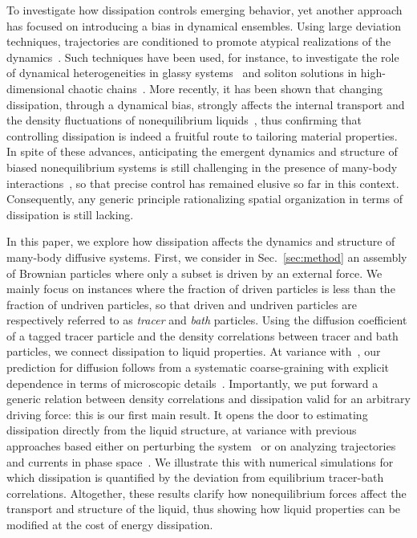 \documentclass[superscriptaddress, twocolumn, prx, longbibliography, nofootinbib]{revtex4-1}
\begin{document}
To investigate how dissipation controls emerging behavior, yet another approach {has focused on} introducing a bias in dynamical ensembles. Using large deviation techniques, trajectories are conditioned to promote atypical realizations of the dynamics~\cite{Touchette2009, Jack2010}. {Such techniques have been used}, for instance, to investigate the role of dynamical heterogeneities in glassy systems~\cite{garrahan2007, Hedges2009, Pitard2011, Speck2012, Bodineau2012a, Limmer2014, Nemoto2017} and soliton solutions in high-dimensional chaotic chains~\cite{tailleur2007probing, laffargue2013}. More recently, it has been shown that changing dissipation, through a dynamical bias, strongly affects the internal transport and the density fluctuations of nonequilibrium liquids~\cite{Cagnetta2017, Nemoto2019}, thus confirming that controlling dissipation is indeed a fruitful route to tailoring material properties. {In spite of these advances}, anticipating the emergent dynamics and structure of biased nonequilibrium systems is still challenging in the presence of many-body interactions~\cite{Chetrite2013, Jack2010}, so that precise control has remained elusive so far in this context. {Consequently}, any generic principle rationalizing spatial organization in terms of dissipation is still lacking.


In this paper, we explore how dissipation affects the dynamics and structure of many-body diffusive systems. First, we consider in Sec.~\ref{sec:method} an assembly of Brownian particles where only a subset is driven by an external force. We mainly focus on instances where the fraction of driven particles is less than the fraction of undriven particles, so that driven and undriven particles are respectively referred to as {\it tracer} and {\it bath} particles. Using the diffusion coefficient of a tagged tracer particle and the density correlations between tracer and bath particles, we connect dissipation to liquid properties. At variance with~\cite{delJunco2018}, our prediction for diffusion follows from a systematic coarse-graining with explicit dependence in terms of microscopic details~\cite{Dean1996, Demery2011, Demery2014}. Importantly, we put forward a generic relation between density correlations and dissipation valid for an arbitrary driving force: this is our first main result. It opens the door to estimating dissipation directly from the liquid structure, at variance with previous approaches based either on perturbing the system~\cite{Harada2005, Mizuno2007, Visco2015, Turlier2016, Ahmed2018} or on analyzing trajectories and currents in phase space~\cite{Battle604, Gingrich2017, Roldan2018, Parrondo2018, Li2018}. We illustrate this with numerical simulations for which dissipation is quantified by the deviation from equilibrium tracer-bath correlations. Altogether, these results clarify how nonequilibrium forces affect the transport and structure of the liquid, thus showing how liquid properties can be modified at the cost of energy dissipation.
\end{document}
